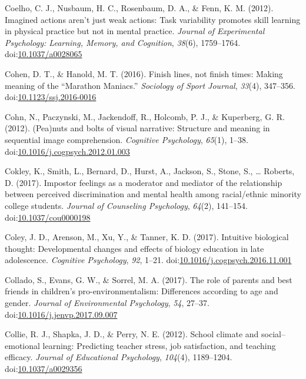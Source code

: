 \documentclass[english,man]{apa6}
\theoremstyle{definition}
\theoremstyle{definition}
\theoremstyle{definition}
\theoremstyle{remark}
\begin{document}
\hypertarget{ref-Coelho2012}{}
Coelho, C. J., Nusbaum, H. C., Rosenbaum, D. A., \& Fenn, K. M. (2012).
Imagined actions aren't just weak actions: Task variability promotes
skill learning in physical practice but not in mental practice.
\emph{Journal of Experimental Psychology: Learning, Memory, and
Cognition}, \emph{38}(6), 1759--1764.
doi:\href{https://doi.org/10.1037/a0028065}{10.1037/a0028065}

\hypertarget{ref-Cohen2016}{}
Cohen, D. T., \& Hanold, M. T. (2016). Finish lines, not finish times:
Making meaning of the ``Marathon Maniacs.'' \emph{Sociology of Sport
Journal}, \emph{33}(4), 347--356.
doi:\href{https://doi.org/10.1123/ssj.2016-0016}{10.1123/ssj.2016-0016}

\hypertarget{ref-Cohn2012}{}
Cohn, N., Paczynski, M., Jackendoff, R., Holcomb, P. J., \& Kuperberg,
G. R. (2012). (Pea)nuts and bolts of visual narrative: Structure and
meaning in sequential image comprehension. \emph{Cognitive Psychology},
\emph{65}(1), 1--38.
doi:\href{https://doi.org/10.1016/j.cogpsych.2012.01.003}{10.1016/j.cogpsych.2012.01.003}

\hypertarget{ref-Cokley2017}{}
Cokley, K., Smith, L., Bernard, D., Hurst, A., Jackson, S., Stone, S.,
\ldots{} Roberts, D. (2017). Impostor feelings as a moderator and
mediator of the relationship between perceived discrimination and mental
health among racial/ethnic minority college students. \emph{Journal of
Counseling Psychology}, \emph{64}(2), 141--154.
doi:\href{https://doi.org/10.1037/cou0000198}{10.1037/cou0000198}

\hypertarget{ref-Coley2017}{}
Coley, J. D., Arenson, M., Xu, Y., \& Tanner, K. D. (2017). Intuitive
biological thought: Developmental changes and effects of biology
education in late adolescence. \emph{Cognitive Psychology}, \emph{92},
1--21.
doi:\href{https://doi.org/10.1016/j.cogpsych.2016.11.001}{10.1016/j.cogpsych.2016.11.001}

\hypertarget{ref-Collado2017}{}
Collado, S., Evans, G. W., \& Sorrel, M. A. (2017). The role of parents
and best friends in children's pro-environmentalism: Differences
according to age and gender. \emph{Journal of Environmental Psychology},
\emph{54}, 27--37.
doi:\href{https://doi.org/10.1016/j.jenvp.2017.09.007}{10.1016/j.jenvp.2017.09.007}

\hypertarget{ref-Collie2012}{}
Collie, R. J., Shapka, J. D., \& Perry, N. E. (2012). School climate and
social--emotional learning: Predicting teacher stress, job satisfaction,
and teaching efficacy. \emph{Journal of Educational Psychology},
\emph{104}(4), 1189--1204.
doi:\href{https://doi.org/10.1037/a0029356}{10.1037/a0029356}
\end{document}

